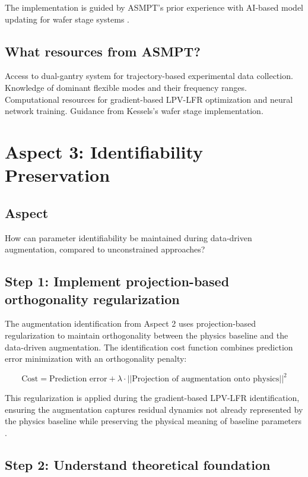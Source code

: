 The implementation is guided by ASMPT's prior experience with AI-based model updating for wafer stage systems \citep{kessels2025}.

\subsection{What resources from ASMPT?}

Access to dual-gantry system for trajectory-based experimental data collection. Knowledge of dominant flexible modes and their frequency ranges. Computational resources for gradient-based LPV-LFR optimization and neural network training. Guidance from Kessels's wafer stage implementation.

\section{Aspect 3: Identifiability Preservation}

\subsection*{Aspect}
How can parameter identifiability be maintained during data-driven augmentation, compared to unconstrained approaches?

\subsection{Step 1: Implement projection-based orthogonality regularization}

The augmentation identification from Aspect 2 uses projection-based regularization to maintain orthogonality between the physics baseline and the data-driven augmentation. The identification cost function combines prediction error minimization with an orthogonality penalty:

\begin{equation*}
\text{Cost} = \text{Prediction error} + \lambda \cdot ||\text{Projection of augmentation onto physics}||^2
\end{equation*}

This regularization is applied during the gradient-based LPV-LFR identification, ensuring the augmentation captures residual dynamics not already represented by the physics baseline while preserving the physical meaning of baseline parameters \citep{gyorok2025projection, kon2022orthogonal}.

\subsection{Step 2: Understand theoretical foundation}

